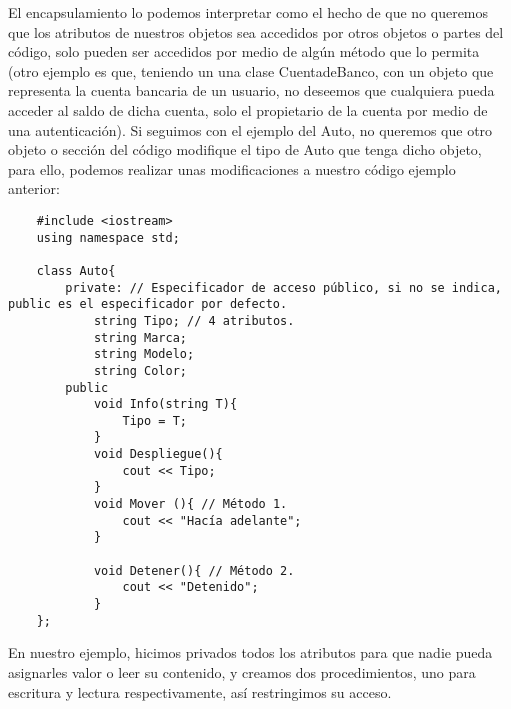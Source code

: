 El encapsulamiento lo podemos interpretar como el hecho de que no queremos que los atributos de nuestros objetos sea accedidos por otros objetos o partes del código, solo pueden ser accedidos por medio de algún método que lo permita (otro ejemplo es que, teniendo un una clase CuentadeBanco, con un objeto que representa la cuenta bancaria de un usuario, no deseemos que cualquiera pueda acceder al saldo de dicha cuenta, solo el propietario de la cuenta por medio de una autenticación). Si seguimos con el ejemplo del Auto, no queremos que otro objeto o sección del código modifique el tipo de Auto que tenga dicho objeto, para ello, podemos realizar unas modificaciones a nuestro código ejemplo anterior:
\begin{lstlisting}
    #include <iostream>
    using namespace std;
    
    class Auto{
        private: // Especificador de acceso público, si no se indica, public es el especificador por defecto.
            string Tipo; // 4 atributos.
            string Marca;
            string Modelo;
            string Color;
        public
            void Info(string T){
                Tipo = T;
            }
            void Despliegue(){
                cout << Tipo;
            }
            void Mover (){ // Método 1.
                cout << "Hacía adelante";
            }
            
            void Detener(){ // Método 2.
                cout << "Detenido";
            }
    };
\end{lstlisting}

En nuestro ejemplo, hicimos privados todos los atributos para que nadie pueda asignarles valor o leer su contenido, y creamos dos procedimientos, uno para escritura y lectura respectivamente, así restringimos su acceso.

